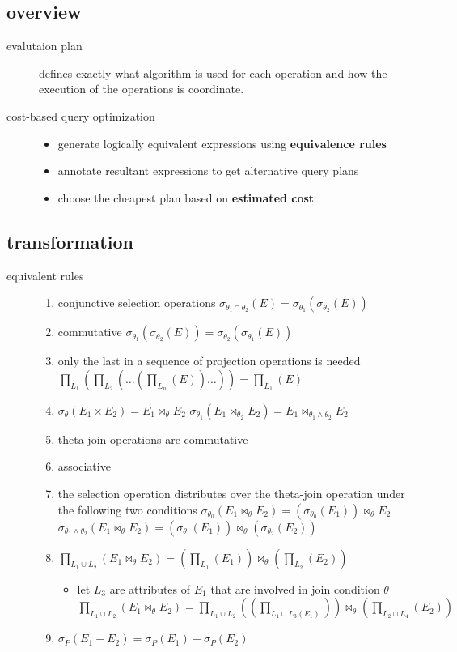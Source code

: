 \documentclass[11pt]{article}
\begin{document}
\subsection{overview}
\label{sec-20-1}
\begin{description}
\item[{evalutaion plan}] defines exactly what algorithm is used for each operation and
how the execution of the operations is coordinate.
\item[{cost-based query optimization}] \begin{itemize}
\item generate logically equivalent expressions using \textbf{equivalence rules}
\item annotate resultant expressions to get alternative query plans
\item choose the cheapest plan based on \textbf{estimated cost}
\end{itemize}
\end{description}
\subsection{transformation}
\label{sec-20-2}
\begin{description}
\item[{equivalent rules}] \begin{enumerate}
\item conjunctive selection operations
$\sigma_{\theta_1\cap\theta_2}(E)=\sigma_{\theta_1}(\sigma_{\theta_2}(E))$
\item commutative
$\sigma_{\theta_1}(\sigma_{\theta_2}(E))=\sigma_{\theta_2}(\sigma_{\theta_1}(E))$
\item only the last in a sequence of projection operations is needed
$\prod_{L_1}(\prod_{L_2}(\dots(\prod_{L_n}(E))\dots))=\prod_{L_1}(E)$
\item $\sigma_\theta(E_1\times E_2)=E_1\bowtie_\theta E_2$
        $\sigma_{\theta_1}(E_1\bowtie_{\theta_2} E_2)=E_1\bowtie_{\theta_1\wedge\theta_2} E_2$
\item theta-join operations are commutative
\item associative
\item the selection operation distributes over the theta-join operation under the following
two conditions
$\sigma_{\theta_0}(E_1\bowtie_\theta E_2)=(\sigma_{\theta_0}(E_1))\bowtie_\theta E_2$
$\sigma_{\theta_1\wedge\theta_2}(E_1\bowtie_\theta E_2)=(\sigma_{\theta_1}(E_1))\bowtie_\theta(\sigma_{\theta_2}(E_2))$
\item $\prod_{L_1\cup L_2}(E_1\bowtie_\theta E_2)=(\prod_{L_1}(E_1))\bowtie_\theta(\prod_{L_2}(E_2))$
\begin{itemize}
\item let $L_3$ are attributes of $E_1$ that are involved in join condition $\theta$
          $\prod_{L_1\cup L_2}(E_1\bowtie_\theta E_2)=\prod_{L_1\cup L_2}((\prod_{L_1\cup L_3(E_1)}))
          \bowtie_\theta(\prod_{L_2\cup L_4}(E_2))$
\end{itemize}
\item $\sigma_P(E_1-E_2)=\sigma_P(E_1)-\sigma_P(E_2)$
\end{enumerate}
\end{description}
\end{document}
